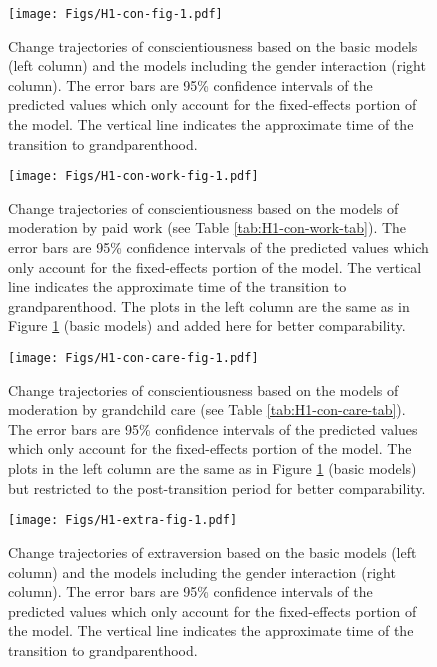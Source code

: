 \documentclass[
  english,
  man, noextraspace]{apa7}
\begin{document}
\begin{appendix}
\begin{figure}
\centering
\texttt{[image: Figs/H1-con-fig-1.pdf]}
\caption{\label{fig:H1-con-fig}Change trajectories of conscientiousness based on
the basic models (left column) and the models including the gender
interaction (right column). The error bars are 95\% confidence intervals
of the predicted values which only account for the fixed-effects portion
of the model. The vertical line indicates the approximate time of the
transition to grandparenthood.}
\end{figure}










\begin{figure}
\centering
\texttt{[image: Figs/H1-con-work-fig-1.pdf]}
\caption{\label{fig:H1-con-work-fig}Change trajectories of conscientiousness based
on the models of moderation by paid work (see Table
\ref{tab:H1-con-work-tab}). The error bars are 95\% confidence intervals
of the predicted values which only account for the fixed-effects portion
of the model. The vertical line indicates the approximate time of the
transition to grandparenthood. The plots in the left column are the same
as in Figure \ref{fig:H1-con-fig} (basic models) and added here for
better comparability.}
\end{figure}









\begin{figure}
\centering
\texttt{[image: Figs/H1-con-care-fig-1.pdf]}
\caption{\label{fig:H1-con-care-fig}Change trajectories of conscientiousness based
on the models of moderation by grandchild care (see Table
\ref{tab:H1-con-care-tab}). The error bars are 95\% confidence intervals
of the predicted values which only account for the fixed-effects portion
of the model. The plots in the left column are the same as in Figure
\ref{fig:H1-con-fig} (basic models) but restricted to the
post-transition period for better comparability.}
\end{figure}








\begin{figure}
\centering
\texttt{[image: Figs/H1-extra-fig-1.pdf]}
\caption{\label{fig:H1-extra-fig}Change trajectories of extraversion based on the
basic models (left column) and the models including the gender
interaction (right column). The error bars are 95\% confidence intervals
of the predicted values which only account for the fixed-effects portion
of the model. The vertical line indicates the approximate time of the
transition to grandparenthood.}
\end{figure}











\end{appendix}
\end{document}
